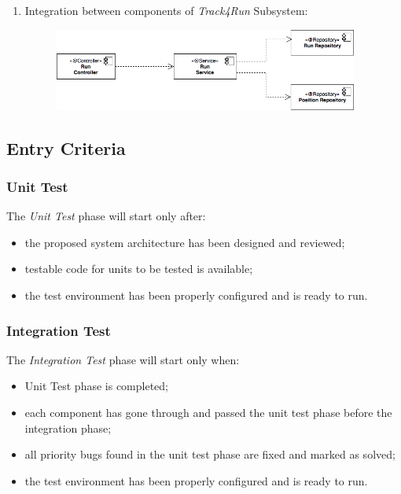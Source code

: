 \documentclass[a4paper]{article}
\begin{document}
\begin{enumerate}
    \item Integration between components of \textit{Track4Run} Subsystem:
    \begin{figure}[!htpb]
    	\centering
    	\includegraphics[width=100mm]{images/test/track4run_integration.png}
    \end{figure}
    
\end{enumerate}

\subsection{Entry Criteria}
\subsubsection{Unit Test}
The \textit{Unit Test} phase will start only after:\\
\begin{itemize}
    \item the proposed system architecture has been designed and reviewed;
    \item testable code for units to be tested is available;
    \item the test environment has been properly configured and is ready to run.
\end{itemize}

\subsubsection{Integration Test}
The \textit{Integration Test} phase will start only when:\\
\begin{itemize}
    \item Unit Test phase is completed;
    \item each component has gone through and passed the unit test phase before the integration phase;
    \item all priority bugs found in the unit test phase are fixed and marked as solved;
    \item the test environment has been properly configured and is ready to run.
\end{itemize}
\end{document}
